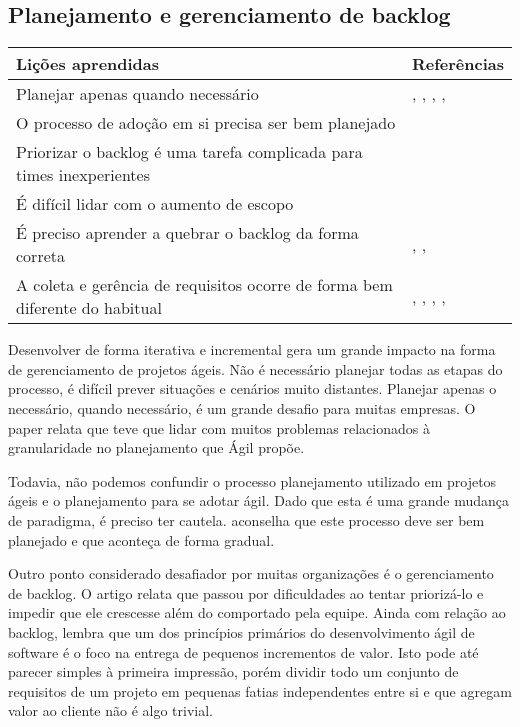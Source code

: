 \subsection{Planejamento e gerenciamento de backlog}

\begin{table}[H]
	\centering
	\begin{tabularx}{\linewidth}{ | X | p{5cm} | } \hline \textbf{Lições aprendidas} & \textbf{Referências} \\ \hline
		Planejar apenas quando necessário & \cite{Hajjdiab2011}, \cite{Fitzgerald2013}, \cite{Piegas2012}, \cite{Hui2013}, \cite{Parzinello2012} \\ \hline
		O processo de adoção em si precisa ser bem planejado & \cite{Hajjdiab2011} \\ \hline
		Priorizar o backlog é uma tarefa complicada para times inexperientes & \cite{Block2011} \\ \hline
		É difícil lidar com o aumento de escopo & \cite{Block2011} \\ \hline
		É preciso aprender a quebrar o backlog da forma correta & \cite{Adobe2012}, \cite{Hui2013}, \cite{Parzinello2012} \\ \hline
		A coleta e gerência de requisitos ocorre de forma bem diferente do habitual & \cite{Bustard2013}, \cite{Korhonen2010}, \cite{Claudia2013}, \cite{Piegas2012}, \cite{Hui2013} \\ \hline
	\end{tabularx}
\end{table}

Desenvolver de forma iterativa e incremental gera um grande impacto na forma de gerenciamento de projetos ágeis. Não é necessário planejar todas as etapas do processo, é difícil prever situações e cenários muito distantes. Planejar apenas o necessário, quando necessário, é um grande desafio para muitas empresas. O paper \cite{Fitzgerald2013} relata que teve que lidar com muitos problemas relacionados à granularidade no planejamento que Ágil propõe.

Todavia, não podemos confundir o processo planejamento utilizado em projetos ágeis e o planejamento para se adotar ágil. Dado que esta é uma grande mudança de paradigma, é preciso ter cautela. \cite{Hajjdiab2011} aconselha que este processo deve ser bem planejado e que aconteça de forma gradual.

Outro ponto considerado desafiador por muitas organizações é o gerenciamento de backlog. O artigo \cite{Block2011} relata que passou por dificuldades ao tentar priorizá-lo e impedir que ele crescesse além do comportado pela equipe. Ainda com relação ao backlog, \cite{Adobe2012} lembra que um dos princípios primários do desenvolvimento ágil de software é o foco na entrega de pequenos incrementos de valor. Isto pode até parecer simples à primeira impressão, porém dividir todo um conjunto de requisitos de um projeto em pequenas fatias independentes entre si e que agregam valor ao cliente não é algo trivial.

